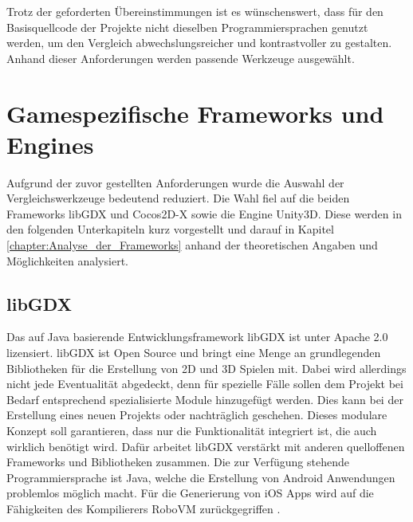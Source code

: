 \bigskip
Trotz der geforderten Übereinstimmungen ist es wünschenswert, dass für den Basisquellcode der Projekte nicht dieselben Programmiersprachen genutzt werden, um den Vergleich abwechslungsreicher und kontrastvoller zu gestalten. Anhand dieser Anforderungen werden passende Werkzeuge ausgewählt.


\section{Gamespezifische Frameworks und Engines}
Aufgrund der zuvor gestellten Anforderungen wurde die Auswahl der Vergleichswerkzeuge bedeutend reduziert. Die Wahl fiel auf die beiden Frameworks libGDX und Cocos2D-X sowie die Engine Unity3D. Diese werden in den folgenden Unterkapiteln kurz vorgestellt und darauf in Kapitel \ref{chapter:Analyse_der_Frameworks} anhand der theoretischen Angaben und Möglichkeiten analysiert.

\subsection{libGDX}
Das auf Java basierende Entwicklungsframework libGDX ist unter Apache 2.0 lizensiert.  libGDX ist Open Source und bringt eine Menge an grundlegenden Bibliotheken für die Erstellung von 2D und 3D Spielen mit. Dabei wird allerdings nicht jede Eventualität abgedeckt, denn für spezielle Fälle sollen dem Projekt bei Bedarf entsprechend spezialisierte Module hinzugefügt werden. Dies kann bei der Erstellung eines neuen Projekts oder nachträglich geschehen. Dieses modulare Konzept soll garantieren, dass nur die Funktionalität integriert ist, die auch wirklich benötigt wird. Dafür arbeitet libGDX verstärkt mit anderen quelloffenen Frameworks und Bibliotheken zusammen. Die zur Verfügung stehende Programmiersprache ist Java, welche die Erstellung von Android Anwendungen problemlos möglich macht. Für die Generierung von iOS Apps wird auf die Fähigkeiten des Kompilierers RoboVM zurückgegriffen \citep{libGDX_main_features}. 


